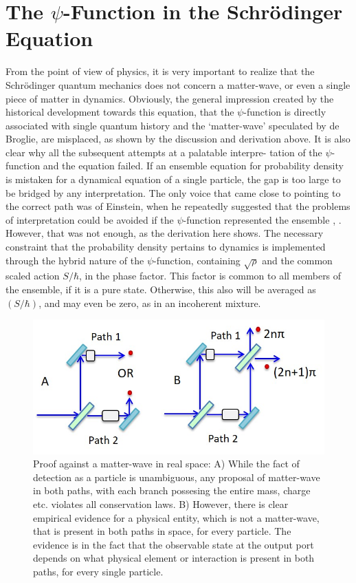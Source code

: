 \section{The $\psi$-Function in the Schr\"{o}dinger\\ Equation}\label{c14-sec3}

From the point of view of physics, it is very important to realize that the Schr\"{o}dinger
quantum mechanics does not concern a matter-wave, or even a single piece of matter in
dynamics. Obviously, the general impression created by the historical development towards
this equation, that the $\psi$-function is directly associated with single quantum history and
the `matter-wave' speculated by de Broglie, are misplaced, as shown by the discussion and
derivation above. It is also clear why all the subsequent attempts at a palatable interpre-
tation of the $\psi$-function and the equation failed. If an ensemble equation for probability
density is mistaken for a dynamical equation of a single particle, the gap is too large to be
bridged by any interpretation. The only voice that came close to pointing to the correct path
was of Einstein, when he repeatedly suggested that the problems of interpretation could be
avoided if the $\psi$-function represented the ensemble \cite{chap14-key3}, \cite{chap14-key4}. However, that was not enough, as
the derivation here shows. The necessary constraint that the probability density pertains to
dynamics is implemented through the hybrid nature of the $\psi$-function, containing $\sqrt{\rho}$ and
the common scaled action $S/\hbar$, in the phase factor. This factor is common to all members
of the ensemble, if it is a pure state. Otherwise, this also will be averaged as $(S/\hbar)$, and
may even be zero, as in an incoherent mixture.

\begin{figure}[t]
\centering
\includegraphics[scale=0.75]{src/images/chap27/1.jpg}
\caption{Proof against a matter-wave in real space: A) While the fact of detection as a particle is
unambiguous, any proposal of matter-wave in both paths, with each branch possesing the entire
mass, charge etc. violates all conservation laws. B) However, there is clear empirical evidence for
a physical entity, which is not a matter-wave, that is present in both paths in space, for every
particle. The evidence is in the fact that the observable state at the output port depends on what
physical element or interaction is present in both paths, for every single particle.}\label{ch14-fig1}
\end{figure}

